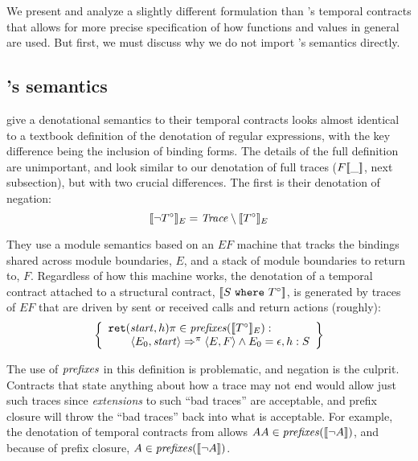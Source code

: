 
We present and analyze a slightly different formulation than \dfm's temporal contracts that allows for more precise specification of how functions and values in general are used.
%
But first, we must discuss why we do not import \dfm's semantics directly.
%
\subsection{\dfm's semantics}

\dfm{} give a denotational semantics to their temporal contracts looks almost identical to a textbook definition of the denotation of regular expressions, with the key difference being the inclusion of binding forms.
%
The details of the full definition are unimportant, and look similar to our denotation of full traces ($F[\![ \_ ]\!]$, next subsection), but with two crucial differences.
%
The first is their denotation of negation:
\newcommand{\denotedfm}[2]{\denote{#1}_{#2}}
\begin{equation*}
  \denotedfm{\stnot{\motcon}}{E} = \mathit{Trace} \setminus \denotedfm{\motcon}{E}
\end{equation*}

They use a module semantics based on an $\mathit{EF}$ machine that tracks the bindings shared across module boundaries, $E$, and a stack of module boundaries to return to, $F$.
%
Regardless of how this machine works, the denotation of a temporal contract attached to a structural contract, $[\![ S\ {\tt where}\ T^\circ ]\!]$, is generated by traces of $\mathit{EF}$ that are driven by sent or received calls and return actions (roughly):
\begin{align*}
 \left\{
   \begin{array}{l}
    {\tt ret}(\mathit{start},h)\mtrace \in \prefixes(\denotedfm{\motcon}{E}) :
 \\ \qquad\langle E_0, \mathit{start}\rangle \Rightarrow^\mtrace \langle E, F\rangle \wedge E_0 = \epsilon, h : S
\end{array}\right\}
\end{align*}

The use of $\mathit{prefixes}$ in this definition is problematic, and negation is the culprit.
%
Contracts that state anything about how a trace may not end would allow just such traces since \emph{extensions} to such ``bad traces'' are acceptable, and prefix closure will throw the ``bad traces'' back into what is acceptable.
%
%
For example, the denotation of temporal contracts from \dfm{} allows $AA \in \mathit{prefixes}([\![ \neg A ]\!])$, and because of prefix closure, $A \in \mathit{prefixes}([\![ \neg A ]\!])$.

